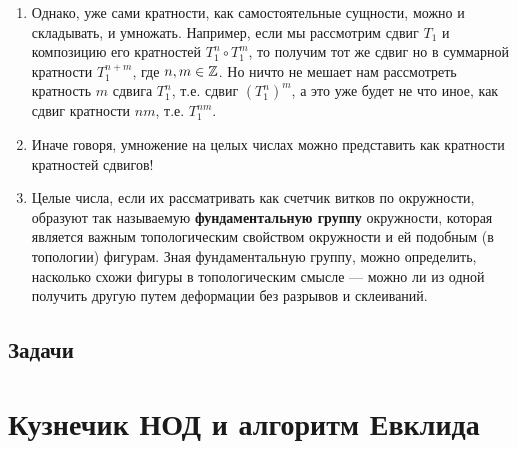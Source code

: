 \begin{enumerate}
\item Однако, уже сами кратности, как самостоятельные сущности, можно и складывать, и умножать. Например, если мы рассмотрим сдвиг $T_1$ и композицию его кратностей $T_1^n\circ T_1^m$, то получим тот же сдвиг но в суммарной кратности $T_1^{n+m}$, где $n,m\in\mathbb Z$. Но ничто не мешает нам рассмотреть кратность $m$ сдвига $T_1^n$, т.е. сдвиг $(T_1^n)^m$, а это уже будет не что иное, как сдвиг кратности $nm$, т.е. $T_1^{nm}$.
\item Иначе говоря, умножение на целых числах можно представить как кратности кратностей сдвигов!
\item Целые числа, если их рассматривать как счетчик витков по окружности, образуют так называемую \textbf{фундаментальную группу} окружности, которая является важным топологическим свойством окружности и ей подобным (в топологии) фигурам. Зная фундаментальную группу, можно определить, насколько схожи фигуры в топологическим смысле --- можно ли из одной получить другую путем деформации без разрывов и склеиваний.
\end{enumerate}
\subsection{Задачи}


\section{Кузнечик НОД и алгоритм Евклида}

